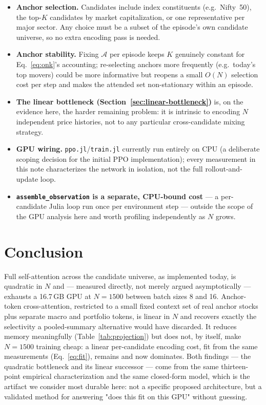 \documentclass[11pt]{article}
\newcommand{\code}[1]{\texttt{#1}}
\begin{document}
\begin{itemize}
  \item \textbf{Anchor selection.} Candidates include index constituents
    (e.g.\ Nifty~50), the top-$K$ candidates by market capitalization, or
    one representative per major sector. Any choice must be a subset of the
    episode's own candidate universe, so no extra encoding pass is needed.
  \item \textbf{Anchor stability.} Fixing $\mathcal{A}$ per episode keeps
    $K$ genuinely constant for Eq.~\eqref{eq:onk}'s accounting; re-selecting
    anchors more frequently (e.g.\ today's top movers) could be more
    informative but reopens a small $O(N)$ selection cost per step and makes
    the attended set non-stationary within an episode.
  \item \textbf{The linear bottleneck (Section~\ref{sec:linear-bottleneck})}
    is, on the evidence here, the harder remaining problem: it is intrinsic
    to encoding $N$ independent price histories, not to any particular
    cross-candidate mixing strategy.
  \item \textbf{GPU wiring.} \code{ppo.jl}/\code{train.jl} currently run
    entirely on CPU (a deliberate scoping decision for the initial PPO
    implementation); every measurement in this note characterizes the
    network in isolation, not the full rollout-and-update loop.
  \item \textbf{\code{assemble\_observation} is a separate, CPU-bound cost}
    --- a per-candidate Julia loop run once per environment step --- outside
    the scope of the GPU analysis here and worth profiling independently as
    $N$ grows.
\end{itemize}

\section{Conclusion}

Full self-attention across the candidate universe, as implemented today, is
quadratic in $N$ and --- measured directly, not merely argued asymptotically
--- exhausts a 16.7\,GB GPU at $N{=}1500$ between batch sizes 8 and 16.
Anchor-token cross-attention, restricted to a small fixed context set of
real anchor stocks plus separate macro and portfolio tokens, is linear in
$N$ and recovers exactly the selectivity a pooled-summary alternative would
have discarded. It reduces memory meaningfully (Table~\ref{tab:projection})
but does not, by itself, make $N{=}1500$ training cheap: a linear
per-candidate encoding cost, fit from the same measurements
(Eq.~\eqref{eq:fit}), remains and now dominates. Both findings --- the
quadratic bottleneck and its linear successor --- come from the same
thirteen-point empirical characterization and the same closed-form model,
which is the artifact we consider most durable here: not a specific
proposed architecture, but a validated method for answering "does this fit
on this GPU" without guessing.



\end{document}
